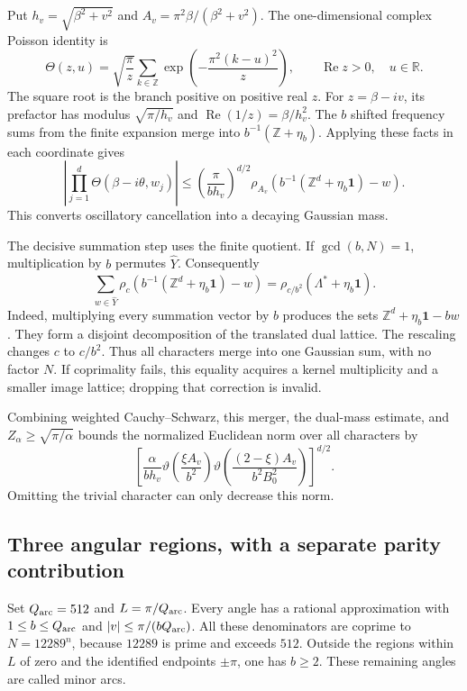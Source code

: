 \documentclass[11pt,a4paper]{article}
\newcommand{\Z}{\mathbb Z}
\newcommand{\R}{\mathbb R}
\theoremstyle{definition}
\theoremstyle{remark}
\numberwithin{equation}{section}
\begin{document}
Put $h_v=\sqrt{\beta^2+v^2}$ and
$A_v=\pi^2\beta/(\beta^2+v^2)$. The one-dimensional complex Poisson identity is
\[
 \Theta(z,u)=\sqrt{\frac\pi z}
 \sum_{k\in\Z}\exp\!\left(-\frac{\pi^2(k-u)^2}{z}\right),
 \qquad \operatorname{Re}z>0,\quad u\in\R.
\]
The square root is the branch positive on positive real $z$.
For $z=\beta-iv$, its prefactor has modulus $\sqrt{\pi/h_v}$
and $\operatorname{Re}(1/z)=\beta/h_v^2$. The $b$ shifted frequency sums
from the finite expansion merge into $b^{-1}(\Z+\eta_b)$.
Applying these facts in each coordinate gives
\begin{equation}
 \left|\prod_{j=1}^d\Theta(\beta-i\theta,w_j)\right|
 \le\left(\frac\pi{bh_v}\right)^{d/2}
 \rho_{A_v}\!\left(b^{-1}(\Z^d+\eta_b\mathbf1)-w\right).
 \label{eq:norm-rational}
\end{equation}
This converts oscillatory cancellation into a decaying Gaussian mass.

The decisive summation step uses the finite quotient. If $\gcd(b,N)=1$,
multiplication by $b$ permutes $\widehat Y$. Consequently
\begin{equation}
 \sum_{w\in\widehat Y}
 \rho_c\!\left(b^{-1}(\Z^d+\eta_b\mathbf1)-w\right)
 =\rho_{c/b^2}(\Lambda^*+\eta_b\mathbf1).
 \label{eq:norm-merger}
\end{equation}
Indeed, multiplying every summation vector by $b$ produces the sets
$\Z^d+\eta_b\mathbf1-bw$. They form a disjoint decomposition of the
translated dual lattice. The rescaling changes $c$ to $c/b^2$.
Thus all characters merge into one Gaussian sum, with no factor $N$.
If coprimality fails, this equality acquires a kernel multiplicity and
a smaller image lattice; dropping that correction is invalid.

Combining weighted Cauchy--Schwarz, this merger, the dual-mass estimate,
and $Z_\alpha\ge\sqrt{\pi/\alpha}$ bounds the normalized Euclidean
norm over all characters by
\begin{equation}
 \left[\frac\alpha{bh_v}
 \vartheta\!\left(\frac{\xi A_v}{b^2}\right)
 \vartheta\!\left(\frac{(2-\xi)A_v}{b^2B_0^2}\right)
 \right]^{d/2}.
 \label{eq:norm-all-character}
\end{equation}
Omitting the trivial character can only decrease this norm.

\subsection{Three angular regions, with a separate parity contribution}

Set $Q_{\rm arc}=512$ and $L=\pi/Q_{\rm arc}$. Every angle has a rational approximation
with $1\le b\le Q_{\rm arc}$ and $|v|\le\pi/(bQ_{\rm arc})$. All these denominators are
coprime to $N=12289^n$, because $12289$ is prime and exceeds $512$.
Outside the regions within $L$ of zero and the identified endpoints
$\pm\pi$, one has $b\ge2$. These remaining angles are called minor arcs.
\end{document}
